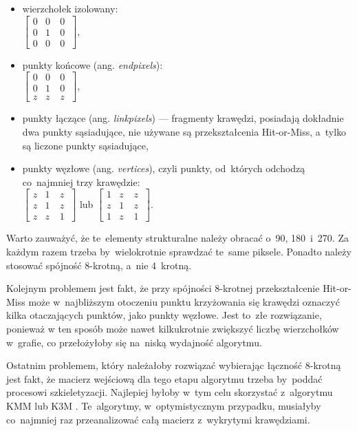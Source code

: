 \documentclass[a4paper,11pt,twoside,openright]{report}
\theoremstyle{definition}
\begin{document}
\begin{itemize}%
\item wierzchołek izolowany: \\
$
\begin{bmatrix}
0 & 0~& 0~\\
0 & 1~& 0~\\
0 & 0~& 0
\end{bmatrix}
$,
\item punkty końcowe (ang. \textit{endpixels}): \\
$
\begin{bmatrix}
0 & 0~& 0~\\
0 & 1~& 0~\\
z & z~& z
\end{bmatrix}
$,
\item punkty łączące (ang. \textit{linkpixels}) --- fragmenty krawędzi, posiadają
dokładnie dwa punkty sąsiadujące, nie używane są przekształcenia Hit-or-Miss, a~tylko są liczone punkty sąsiadujące,
\item punkty węzłowe (ang. \textit{vertices}), czyli punkty, od~których odchodzą co~najmniej trzy krawędzie: \\
$
\begin{bmatrix}
z & 1~& z~\\
z & 1~& z~\\
z & z~& 1
\end{bmatrix}
$ lub $
\begin{bmatrix}
1 & z~& z~\\
z & 1~& z~\\
1 & z~& 1
\end{bmatrix}
$.
\end{itemize}

Warto zauważyć, że te~elementy strukturalne należy obracać o~90\textdegree, 180\textdegree~i~270\textdegree.
Za każdym razem trzeba by~wielokrotnie sprawdzać te~same piksele. Ponadto należy
stosować spójność 8-krotną, a~nie 4~krotną.

Kolejnym problemem jest fakt, że przy spójności 8-krotnej przekształcenie
Hit-or-Miss może w~najbliższym otoczeniu punktu krzyżowania się krawędzi oznaczyć
kilka otaczających punktów, jako punkty węzłowe. Jest to~złe rozwiązanie, ponieważ
w ten sposób może nawet kilkukrotnie zwiększyć liczbę wierzchołków w~grafie, co
przełożyłoby się na~niską wydajność algorytmu.

Ostatnim problemem, który należałoby rozwiązać wybierając łączność 8-krotną
jest fakt, że macierz wejściową dla tego etapu algorytmu trzeba by~poddać procesowi
szkieletyzacji. Najlepiej byłoby w~tym celu skorzystać z~algorytmu KMM \cite{KMM}
lub K3M \cite{K3M}. Te~algorytmy, w~optymistycznym przypadku, musiałyby co~najmniej
raz przeanalizować całą macierz z~wykrytymi krawędziami.
\end{document}
